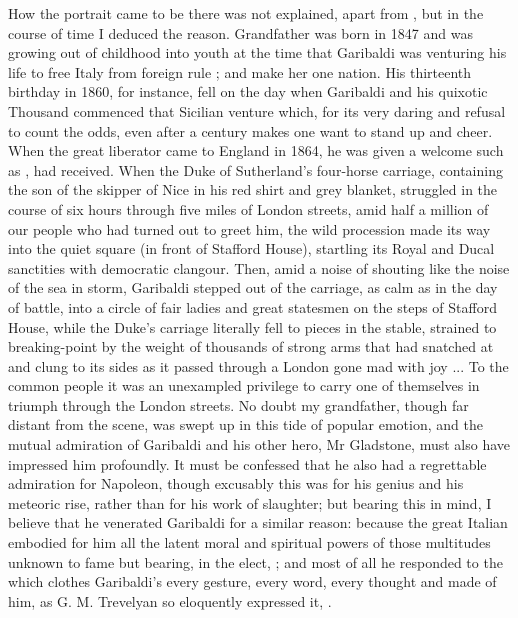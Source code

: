 How the portrait came to be there was not explained, apart from , but in the course of time I deduced the reason. Grandfather was born in 1847 and was growing out of childhood into youth at the time that Garibaldi was venturing his life to free Italy from foreign rule ; and make her one nation. His thirteenth birthday in 1860, for instance, fell on the day when Garibaldi and his quixotic Thousand commenced that Sicilian venture which, for its very daring and refusal to count the odds, even after a century makes one want to stand up and cheer. When the great liberator came to England in 1864, he was given a welcome such as , had received. When the Duke of Sutherland's four-horse carriage, containing the son of the skipper of Nice in his red shirt and grey blanket, struggled in the course of six hours through five miles of London streets, amid half a million of our people who had turned out to greet him, the wild procession made its way into the quiet square (in front of Stafford House), startling its Royal and Ducal sanctities with democratic clangour. Then, amid a noise of shouting like the noise of the sea in storm, Garibaldi stepped out of the carriage, as calm as in the day of battle, into a circle of fair ladies and great statesmen on the steps of Stafford House, while the Duke's carriage literally fell to pieces in the stable, strained to breaking-point by the weight of thousands of strong arms that had snatched at and clung to its sides as it passed through a London gone mad with joy ... To the common people it was an unexampled privilege to carry one of themselves in triumph through the London streets. No doubt my grandfather, though far distant from the scene, was swept up in this tide of popular emotion, and the mutual admiration of Garibaldi and his other hero, Mr Gladstone, must also have impressed him profoundly. It must be confessed that he also had a regrettable admiration for Napoleon, though excusably this was for his genius and his meteoric rise, rather than for his work of slaughter; but bearing this in mind, I believe that he venerated Garibaldi for a similar reason: because the great Italian embodied for him all the latent moral and spiritual powers of those multitudes unknown to fame but bearing, in the elect, ; and most of all he responded to the  which clothes Garibaldi's every gesture, every word, every thought and made of him, as G. M. Trevelyan so eloquently expressed it, .